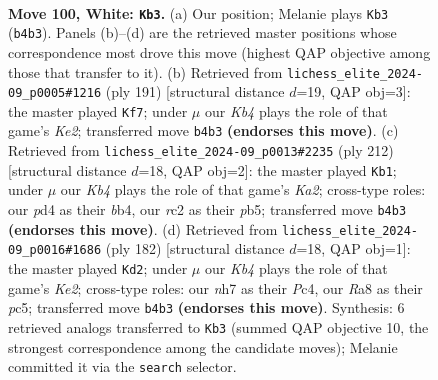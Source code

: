 \documentclass[11pt]{article}
\begin{document}
\clearpage

\begin{figure}[p]\centering
\begin{subfigure}{0.46\textwidth}\centering
\resizebox{\linewidth}{!}{%
\newchessgame
\chessboard[
  setfen={R7/7n/7p/4p2k/1K1p3b/8/2r5/8 w - - 18 100},
  showmover=false,
  pgfstyle=straightmove, color=movearrow, markmove={b4-b3}
]}
\caption{}
\end{subfigure}\hfill
\begin{subfigure}{0.46\textwidth}\centering
\resizebox{\linewidth}{!}{%
\newchessgame
\chessboard[
  setfen={8/4k3/6R1/6Pp/4BK1P/8/8/2r5 b - - 0 96},
  showmover=false,
  pgfstyle=straightmove, color=movearrow, markmove={e7-f7}
]}
\caption{}
\end{subfigure}
\\[4pt]
\begin{subfigure}{0.46\textwidth}\centering
\resizebox{\linewidth}{!}{%
\newchessgame
\chessboard[
  setfen={8/8/6k1/pp4pp/1b6/8/K7/8 w - - 4 107},
  showmover=false,
  pgfstyle=straightmove, color=movearrow, markmove={a2-b1}
]}
\caption{}
\end{subfigure}\hfill
\begin{subfigure}{0.46\textwidth}\centering
\resizebox{\linewidth}{!}{%
\newchessgame
\chessboard[
  setfen={8/7p/5k2/2p2b2/1pP2P2/r7/4K3/8 w - - 2 92},
  showmover=false,
  pgfstyle=straightmove, color=movearrow, markmove={e2-d2}
]}
\caption{}
\end{subfigure}
\caption{\textbf{Move 100, White: \texttt{Kb3}.} (a) Our position; Melanie plays \texttt{Kb3} (\texttt{b4b3}). Panels (b)--(d) are the retrieved master positions whose correspondence most drove this move (highest QAP objective among those that transfer to it). (b) Retrieved from \texttt{lichess\_elite\_2024-09\_p0005\#1216} (ply 191) [structural distance $d$=19, QAP obj=3]: the master played \texttt{Kf7}; under $\mu$ our \emph{Kb4} plays the role of that game's \emph{Ke2}; transferred move \texttt{b4b3} \textbf{(endorses this move)}. (c) Retrieved from \texttt{lichess\_elite\_2024-09\_p0013\#2235} (ply 212) [structural distance $d$=18, QAP obj=2]: the master played \texttt{Kb1}; under $\mu$ our \emph{Kb4} plays the role of that game's \emph{Ka2}; cross-type roles: our \emph{p}d4 as their \emph{b}b4, our \emph{r}c2 as their \emph{p}b5; transferred move \texttt{b4b3} \textbf{(endorses this move)}. (d) Retrieved from \texttt{lichess\_elite\_2024-09\_p0016\#1686} (ply 182) [structural distance $d$=18, QAP obj=1]: the master played \texttt{Kd2}; under $\mu$ our \emph{Kb4} plays the role of that game's \emph{Ke2}; cross-type roles: our \emph{n}h7 as their \emph{P}c4, our \emph{R}a8 as their \emph{p}c5; transferred move \texttt{b4b3} \textbf{(endorses this move)}. Synthesis: 6 retrieved analogs transferred to \texttt{Kb3} (summed QAP objective 10, the strongest correspondence among the candidate moves); Melanie committed it via the \texttt{search} selector.}
\label{fig:thought-m198}
\end{figure}
\end{document}
